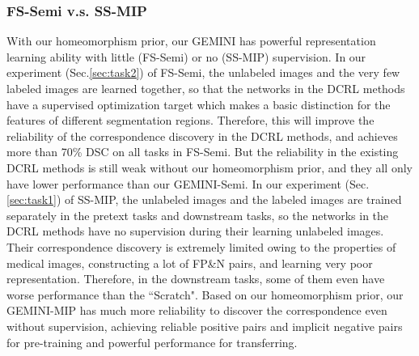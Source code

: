 \subsubsection{FS-Semi v.s. SS-MIP}
With our homeomorphism prior, our GEMINI has powerful representation learning ability with little (FS-Semi) or no (SS-MIP) supervision. In our experiment (Sec.\ref{sec:task2}) of FS-Semi, the unlabeled images and the very few labeled images are learned together, so that the networks in the DCRL methods have a supervised optimization target which makes a basic distinction for the features of different segmentation regions. Therefore, this will improve the reliability of the correspondence discovery in the DCRL methods, and achieves more than 70\% DSC on all tasks in FS-Semi. But the reliability in the existing DCRL methods is still weak without our homeomorphism prior, and they all only have lower performance than our GEMINI-Semi. In our experiment (Sec.\ref{sec:task1}) of SS-MIP, the unlabeled images and the labeled images are trained separately in the pretext tasks and downstream tasks, so the networks in the DCRL methods have no supervision during their learning unlabeled images. Their correspondence discovery is extremely limited owing to the properties of medical images, constructing a lot of FP\&N pairs, and learning very poor representation. Therefore, in the downstream tasks, some of them even have worse performance than the ``Scratch". Based on our homeomorphism prior, our GEMINI-MIP has much more reliability to discover the correspondence even without supervision, achieving reliable positive pairs and implicit negative pairs for pre-training and powerful performance for transferring.
